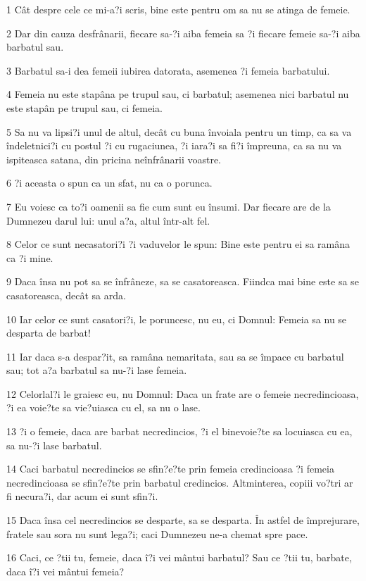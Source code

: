 \par 1 Cât despre cele ce mi-a?i scris, bine este pentru om sa nu se atinga de femeie.
\par 2 Dar din cauza desfrânarii, fiecare sa-?i aiba femeia sa ?i fiecare femeie sa-?i aiba barbatul sau.
\par 3 Barbatul sa-i dea femeii iubirea datorata, asemenea ?i femeia barbatului.
\par 4 Femeia nu este stapâna pe trupul sau, ci barbatul; asemenea nici barbatul nu este stapân pe trupul sau, ci femeia.
\par 5 Sa nu va lipsi?i unul de altul, decât cu buna învoiala pentru un timp, ca sa va îndeletnici?i cu postul ?i cu rugaciunea, ?i iara?i sa fi?i împreuna, ca sa nu va ispiteasca satana, din pricina neînfrânarii voastre.
\par 6 ?i aceasta o spun ca un sfat, nu ca o porunca.
\par 7 Eu voiesc ca to?i oamenii sa fie cum sunt eu însumi. Dar fiecare are de la Dumnezeu darul lui: unul a?a, altul într-alt fel.
\par 8 Celor ce sunt necasatori?i ?i vaduvelor le spun: Bine este pentru ei sa ramâna ca ?i mine.
\par 9 Daca însa nu pot sa se înfrâneze, sa se casatoreasca. Fiindca mai bine este sa se casatoreasca, decât sa arda.
\par 10 Iar celor ce sunt casatori?i, le poruncesc, nu eu, ci Domnul: Femeia sa nu se desparta de barbat!
\par 11 Iar daca s-a despar?it, sa ramâna nemaritata, sau sa se împace cu barbatul sau; tot a?a barbatul sa nu-?i lase femeia.
\par 12 Celorlal?i le graiesc eu, nu Domnul: Daca un frate are o femeie necredincioasa, ?i ea voie?te sa vie?uiasca cu el, sa nu o lase.
\par 13 ?i o femeie, daca are barbat necredincios, ?i el binevoie?te sa locuiasca cu ea, sa nu-?i lase barbatul.
\par 14 Caci barbatul necredincios se sfin?e?te prin femeia credincioasa ?i femeia necredincioasa se sfin?e?te prin barbatul credincios. Altminterea, copiii vo?tri ar fi necura?i, dar acum ei sunt sfin?i.
\par 15 Daca însa cel necredincios se desparte, sa se desparta. În astfel de împrejurare, fratele sau sora nu sunt lega?i; caci Dumnezeu ne-a chemat spre pace.
\par 16 Caci, ce ?tii tu, femeie, daca î?i vei mântui barbatul? Sau ce ?tii tu, barbate, daca î?i vei mântui femeia?
